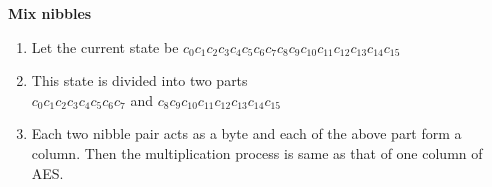 \begin{frame}
	\textbf{Mix nibbles}
\begin{enumerate}

	\item Let the current state be $c_{0} c_{1} c_{2} c_{3} c_{4} c_{5} c_{6} c_{7} c_{8} c_{9} c_{10} c_{11} c_{12} c_{13} c_{14} c_{15}$\\
	
	\item This state is divided into two parts \\
	$ c_{0} c_{1} c_{2} c_{3} c_{4} c_{5} c_{6} c_{7} $ and $c_{8} c_{9} c_{10} c_{11} c_{12} c_{13} c_{14} c_{15}$ \\
	
	\item Each two nibble pair acts as a byte and each of the above part form a column. Then the multiplication process is same as that of one column of AES.
\end{enumerate}

\end{frame}	


